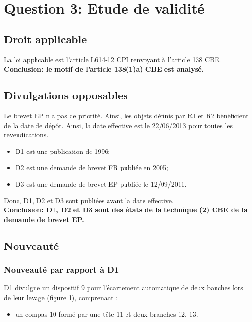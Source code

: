 \section{Question 3: Etude de validité}

\subsection{Droit applicable}

La loi applicable est l'article L614-12 CPI renvoyant
à l'article 138 CBE.\\

\textbf{Conclusion: le motif de l'article 138(1)a) CBE
est analysé.}

\subsection{Divulgations opposables}

Le brevet EP n'a pas de priorité. Ainsi, les objets
définis par R1 et R2 bénéficient de la date de dépôt.
Ainsi, la date effective est le 22/06/2013
pour toutes les revendications.

\begin{itemize}
    \item D1 est une publication de 1996;
    \item D2 est une demande de brevet FR publiée en 2005;
    \item D3 est une demande de brevet EP publiée le 12/09/2011.
\end{itemize}
Donc, D1, D2 et D3 sont publiées avant la date effective.\\

\textbf{Conclusion: D1, D2 et D3 sont des états de la technique (2) CBE de la demande de brevet EP.}\\

\subsection{Nouveauté}

\subsubsection{Nouveauté par rapport à D1}

D1 divulgue un dispositif 9 pour l’écartement automatique
de deux banches lors de leur levage (figure 1), comprenant :

\begin{itemize}
\item un compas 10 formé par une tête 11 et deux branches 12, 13.\\
\end{itemize}

